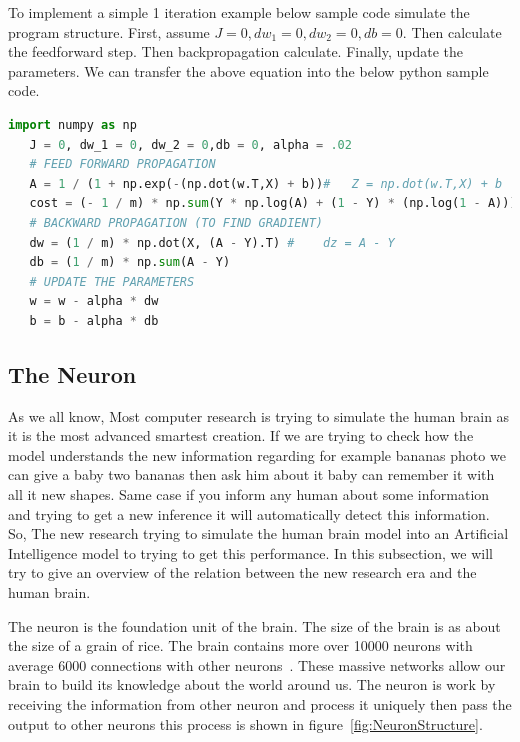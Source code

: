To implement a simple 1 iteration example below sample code simulate the program structure. First,  assume $J = 0, dw_1 = 0, dw_2 = 0,db = 0$. Then calculate the feedforward step. Then backpropagation calculate. Finally, update the parameters. We can transfer the above equation into the below python sample code. 
 \begin{lstlisting}[language=Python]
   import numpy as np
   J = 0, dw_1 = 0, dw_2 = 0,db = 0, alpha = .02
   # FEED FORWARD PROPAGATION
   A = 1 / (1 + np.exp(-(np.dot(w.T,X) + b))#   Z = np.dot(w.T,X) + b
   cost = (- 1 / m) * np.sum(Y * np.log(A) + (1 - Y) * (np.log(1 - A)))
   # BACKWARD PROPAGATION (TO FIND GRADIENT)
   dw = (1 / m) * np.dot(X, (A - Y).T) #    dz = A - Y
   db = (1 / m) * np.sum(A - Y)
   # UPDATE THE PARAMETERS
   w = w - alpha * dw
   b = b - alpha * db
 \end{lstlisting}

 
 \subsection{The Neuron}

 As we all know, Most computer research is trying to simulate the human brain as it is the most advanced smartest creation. If we are trying to check how the model understands the new information regarding for example bananas photo we can give a baby two bananas then ask him about it baby can remember it with all it new shapes. Same case if you inform any human about some information and trying to get a new inference it will automatically detect this information. So, The new research trying to simulate the human brain model into an Artificial Intelligence model to trying to get this performance. In this subsection, we will try to give an overview of the relation between the new research era and the human brain.
 
 The neuron is the foundation unit of the brain. The size of the brain is as about the size of a grain of rice. The brain contains more over 10000 neurons with average 6000 connections with other neurons~\cite{Restak_2001}.  These massive networks allow our brain to build its knowledge about the world around us. The neuron is work by receiving the information from other neuron and process it uniquely then pass the output to other neurons this process is shown in figure~\ref{fig:NeuronStructure}.

